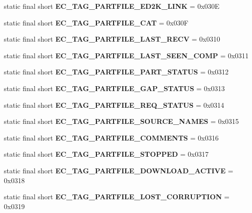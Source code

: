 \begin{DoxyCompactItemize}
\item 
static final short {\bfseries EC\_\-TAG\_\-PARTFILE\_\-ED2K\_\-LINK} = 0x030E\label{interfaceECCodes_a114fab35c2734e381ee622ba865b9079}

\item 
static final short {\bfseries EC\_\-TAG\_\-PARTFILE\_\-CAT} = 0x030F\label{interfaceECCodes_a5fbd94bd9cc3cefc698cedd8b9c3b5ba}

\item 
static final short {\bfseries EC\_\-TAG\_\-PARTFILE\_\-LAST\_\-RECV} = 0x0310\label{interfaceECCodes_a1f79bce1c6d9a94544ddcd916de08f2d}

\item 
static final short {\bfseries EC\_\-TAG\_\-PARTFILE\_\-LAST\_\-SEEN\_\-COMP} = 0x0311\label{interfaceECCodes_a1e8a37e6cd3b95819731ac3cb40f74b6}

\item 
static final short {\bfseries EC\_\-TAG\_\-PARTFILE\_\-PART\_\-STATUS} = 0x0312\label{interfaceECCodes_a9d143a937a4924aad42067730f02ab21}

\item 
static final short {\bfseries EC\_\-TAG\_\-PARTFILE\_\-GAP\_\-STATUS} = 0x0313\label{interfaceECCodes_a5130ceaf60933bfabb61fba707fcafb9}

\item 
static final short {\bfseries EC\_\-TAG\_\-PARTFILE\_\-REQ\_\-STATUS} = 0x0314\label{interfaceECCodes_a275c7d25aa792e69aeb66e464a59166f}

\item 
static final short {\bfseries EC\_\-TAG\_\-PARTFILE\_\-SOURCE\_\-NAMES} = 0x0315\label{interfaceECCodes_a25c4abb2526ba006db96e30b7f7587bf}

\item 
static final short {\bfseries EC\_\-TAG\_\-PARTFILE\_\-COMMENTS} = 0x0316\label{interfaceECCodes_a3666953cb53d131cd546aa541f68b313}

\item 
static final short {\bfseries EC\_\-TAG\_\-PARTFILE\_\-STOPPED} = 0x0317\label{interfaceECCodes_aba0d86da50e4bd433f98483335314ad4}

\item 
static final short {\bfseries EC\_\-TAG\_\-PARTFILE\_\-DOWNLOAD\_\-ACTIVE} = 0x0318\label{interfaceECCodes_ae8a9dc68bcc785c3a95b3d6b49ac9fd6}

\item 
static final short {\bfseries EC\_\-TAG\_\-PARTFILE\_\-LOST\_\-CORRUPTION} = 0x0319\label{interfaceECCodes_a9a7f00bd0c5e47a377b79703c0da9852}


\end{DoxyCompactItemize}
